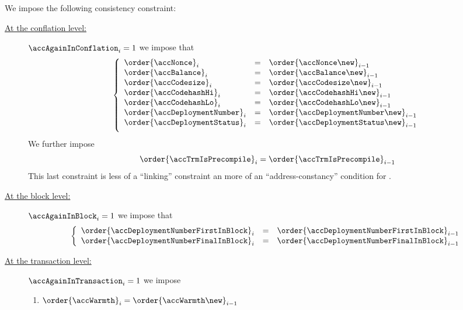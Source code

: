 We impose the following consistency constraint:
\begin{description}
	\item[\underline{At the conflation level:}]
		\If $\accAgainInConflation_{i} = 1$
		\Then we impose that
		\[
			\left\{ \begin{array}{lcl}
				\order{\accNonce            }_{i} & = & \order{\accNonce               \new }_{i - 1}              \\
				\order{\accBalance          }_{i} & = & \order{\accBalance             \new }_{i - 1}              \\
				\order{\accCodesize         }_{i} & = & \order{\accCodesize            \new }_{i - 1}              \\
				\order{\accCodehashHi       }_{i} & = & \order{\accCodehashHi          \new }_{i - 1}              \\
				\order{\accCodehashLo       }_{i} & = & \order{\accCodehashLo          \new }_{i - 1}              \\
				\order{\accDeploymentNumber }_{i} & = & \order{\accDeploymentNumber    \new }_{i - 1}              \\
				\order{\accDeploymentStatus }_{i} & = & \order{\accDeploymentStatus    \new }_{i - 1} \vspace{2mm} \\
			\end{array} \right.
		\]
		We further impose
		\[
			\order{\accTrmIsPrecompile}_{i} = \order{\accTrmIsPrecompile}_{i - 1}
		\]
		\saNote{} This last constraint is less of a ``linking'' constraint an more of an ``address-constancy'' condition for \accTrmIsPrecompile{}.
	\item[\underline{At the block level:}]
		\If $\accAgainInBlock_{i} = 1$
		\Then we impose that
		\[
			\left\{ \begin{array}{lcl}
				\order{\accDeploymentNumberFirstInBlock} _{i} & = & \order{\accDeploymentNumberFirstInBlock} _{i - 1} \\
				\order{\accDeploymentNumberFinalInBlock} _{i} & = & \order{\accDeploymentNumberFinalInBlock} _{i - 1} \\
			\end{array} \right.
		\]
	\item[\underline{At the transaction level:}]
		\If $\accAgainInTransaction_{i} = 1$
		\Then we impose
		\begin{enumerate}
			\item $\order{\accWarmth}_{i}                = \order{\accWarmth\new}_{i                - 1} $

\end{enumerate}
\end{description}
